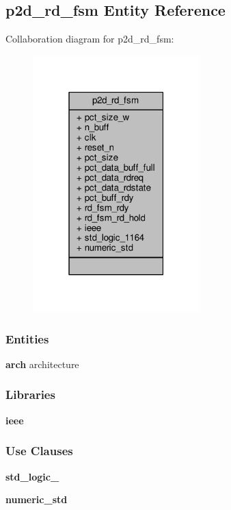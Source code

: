 \subsection{p2d\+\_\+rd\+\_\+fsm Entity Reference}
\label{classp2d__rd__fsm}


Collaboration diagram for p2d\+\_\+rd\+\_\+fsm\+:\nopagebreak
\begin{figure}[H]
\begin{center}
\leavevmode
\includegraphics[width=183pt]{d6/d0c/classp2d__rd__fsm__coll__graph}
\end{center}
\end{figure}
\subsubsection*{Entities}
\begin{DoxyCompactItemize}
\item 
{\bf arch} architecture
\end{DoxyCompactItemize}
\subsubsection*{Libraries}
 \begin{DoxyCompactItemize}
\item 
{\bf ieee} 
\end{DoxyCompactItemize}
\subsubsection*{Use Clauses}
 \begin{DoxyCompactItemize}
\item 
{\bf std\+\_\+logic\+\_}   
\item 
{\bf numeric\+\_\+std}   
\end{DoxyCompactItemize}
